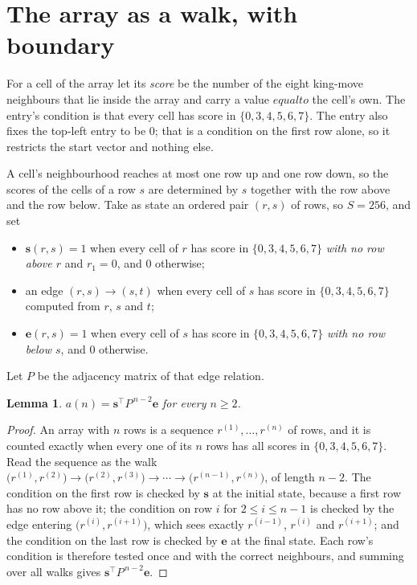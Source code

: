 \documentclass[11pt,a4paper]{article}
\theoremstyle{plain}
\newtheorem{lemma}[theorem]{Lemma}
\theoremstyle{definition}
\begin{document}
\section{The array as a walk, with boundary}

For a cell of the array let its \emph{score} be the number of the eight king-move neighbours that lie inside
the array and carry a value $equal to$ the cell's own. The entry's condition is that every cell
has score in $\{0,3,4,5,6,7\}$. The entry also fixes the top-left entry to be $0$; that is a condition on the first row alone, so it restricts the start vector and nothing else.

A cell's neighbourhood reaches at most one row up and one row down, so the scores of the
cells of a row $s$ are determined by $s$ together with the row above and the row below.
Take as state an ordered pair $(r,s)$ of rows, so $S=256$, and set
\begin{itemize}
\item $\mathbf{s}(r,s)=1$ when every cell of $r$ has score in $\{0,3,4,5,6,7\}$ \emph{with no row
above $r$} and $r_1=0$, and $0$ otherwise;
\item an edge $(r,s)\to(s,t)$ when every cell of $s$ has score in $\{0,3,4,5,6,7\}$ computed from
$r$, $s$ and $t$;
\item $\mathbf{e}(r,s)=1$ when every cell of $s$ has score in $\{0,3,4,5,6,7\}$ \emph{with no row
below $s$}, and $0$ otherwise.
\end{itemize}
Let $P$ be the adjacency matrix of that edge relation.

\begin{lemma}\label{lem:walk}
$a(n)=\mathbf{s}^{\!\top}P^{\,n-2}\mathbf{e}$ for every $n\ge2$.
\end{lemma}

\begin{proof}
An array with $n$ rows is a sequence $r^{(1)},\dots,r^{(n)}$ of rows, and it is counted
exactly when every one of its $n$ rows has all scores in $\{0,3,4,5,6,7\}$. Read the sequence as the
walk $\bigl(r^{(1)},r^{(2)}\bigr)\to\bigl(r^{(2)},r^{(3)}\bigr)\to\cdots\to
\bigl(r^{(n-1)},r^{(n)}\bigr)$, of length $n-2$. The condition on the first row is
checked by $\mathbf{s}$ at the initial state, because a first row has no row above it; the
condition on row $i$ for $2\le i\le n-1$ is checked by the edge entering
$\bigl(r^{(i)},r^{(i+1)}\bigr)$, which sees exactly $r^{(i-1)}$, $r^{(i)}$ and
$r^{(i+1)}$; and the condition on the last row is checked by $\mathbf{e}$ at the final
state. Each row's condition is therefore tested once and with the correct neighbours, and
summing over all walks gives $\mathbf{s}^{\!\top}P^{\,n-2}\mathbf{e}$.
\end{proof}
\end{document}
